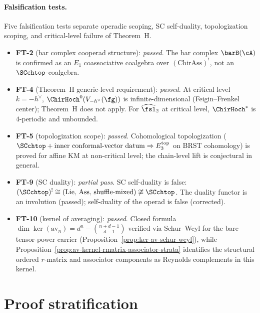 \paragraph{Falsification tests.}
Five falsification tests separate operadic scoping,
SC self-duality, topologization scoping, and critical-level
failure of Theorem~H.
\begin{itemize}
\item \textbf{FT-2} (bar complex cooperad structure):
 \emph{passed}. The bar complex $\barB(\cA)$ is confirmed as an
 $E_1$ coassociative coalgebra over $(\mathrm{ChirAss})^!$,
 not an $\SCchtop$-coalgebra.
\item \textbf{FT-4} (Theorem~H generic-level requirement):
 \emph{passed}. At critical level $k = -h^\vee$,
 $\ChirHoch^0(V_{-h^\vee}(\fg))$ is infinite-dimensional
 (Feigin--Frenkel center); Theorem~H does not apply.
 For $\widehat{\fsl}_2$ at critical level, $\ChirHoch^*$ is
 $4$-periodic and unbounded.
\item \textbf{FT-5} (topologization scope):
 \emph{passed}. Cohomological topologization
 ($\SCchtop + \text{inner conformal-vector datum}
 \Rightarrow E_3^{\mathrm{top}}$ on BRST cohomology)
 is proved for affine KM at non-critical level; the
 chain-level lift is conjectural in general.
\item \textbf{FT-9} (SC duality):
 \emph{partial pass}. SC self-duality is false:
 $(\SCchtop)^! \cong (\mathrm{Lie},\, \mathrm{Ass},\,
 \text{shuffle-mixed}) \not\cong \SCchtop$.
 The duality functor is an involution (passed);
 self-duality of the operad is false (corrected).
\item \textbf{FT-10} (kernel of averaging):
 \emph{passed}. Closed formula
 $\dim\ker(\mathrm{av}_n) = d^n - \binom{n+d-1}{d-1}$
 verified via Schur--Weyl for the bare tensor-power carrier
 (Proposition~\ref{prop:ker-av-schur-weyl}), while
 Proposition~\ref{prop:av-kernel-rmatrix-associator-strata} identifies
 the structural ordered $r$-matrix and associator components as
 Reynolds complements in this kernel.
\end{itemize}

\section{Proof stratification}
\label{sec:concordance-programme-record}

